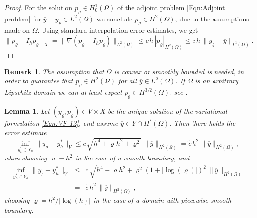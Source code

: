 \documentclass{article}
\newtheorem{lemma}{Lemma}
\newtheorem{remark}{Remark}
\numberwithin{equation}{section}
\begin{document}
\begin{proof}
  For the solution $p_\varrho \in H^1_0(\Omega)$ of the adjoint problem
  \eqref{Eqn:Adjoint problem} for
  $\overline{y}-y_\varrho \in L^2(\Omega)$ we conclude
  $p_\varrho \in H^2(\Omega)$, due to the assumptions made on $\Omega$. 
  Using standard interpolation error estimates, 
  we get
  \[
    \| p_\varrho - I_h p_\varrho \|_X =
    \| \nabla ( p_\varrho - I_h p_\varrho) \|_{L^2(\Omega)} \leq
    c \, h \, |p_\varrho|_{H^2(\Omega)} \leq
    c \, h \, \| y_\varrho - \overline{y} \|_{L^2(\Omega)} .
  \]
\end{proof}


\begin{remark}
  The assumption that $\Omega$ is convex or smoothly bounded is needed, in
  order to guarantee that $p_\varrho\in H^2(\Omega)$ for all
  $\overline{y} \in L^2(\Omega)$. If $\Omega$ is an arbitrary Lipschitz domain we can at least expect $p_\varrho\in H^{3/2}(\Omega)$, see \cite[Cor. 3.7 (ii)]{BehrndtGesztesyMitrea2025}. 
\end{remark}


\begin{lemma}
  Let $(y_\varrho,p_\varrho) \in V \times X$ be the unique solution of the
  variational formulation \eqref{Eqn:VF 12}, and assume
  $\overline{y} \in Y \cap H^2(\Omega)$. Then
  there holds the error estimate
  \begin{equation}\label{Eqn:Error yrho}
    \inf\limits_{y_h^* \in Y_h}
    \| y_\varrho - y_h^* \|_V \leq c \, 
    \sqrt{h^4 + \varrho h^2 + \varrho^2} \, \| \overline{y} \|_{H^2(\Omega)} =
    \widetilde{c} \, h^2 \, \| \overline{y} \|_{H^2(\Omega)},
  \end{equation}
  when choosing $\varrho = h^2$ in the case of a smooth boundary, and 
  \begin{eqnarray}
    \inf\limits_{y_h^* \in Y_h}
    \| y_\varrho - y_h^* \|_V
    &\leq & c \, \sqrt{h^4 + \varrho h^2 + \varrho^2(1+|\log(\varrho)|)^2} \,
            \| \overline{y} \|_{H^2(\Omega)} \nonumber \\
    & = & \label{Eqn:Error yrho p.w. 1}
    \widetilde{c} \, h^2 \, \| \overline{y} \|_{H^2(\Omega)},
  \end{eqnarray}
  choosing $\varrho = h^2/|\log(h)|$ in the case of a domain with piecewise
  smooth boundary.
\end{lemma}
\end{document}
